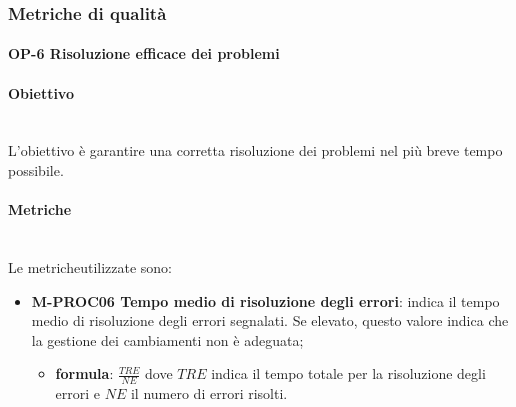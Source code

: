 \subsubsection{Metriche di qualità}
	\paragraph{OP-6 Risoluzione efficace dei problemi}
	\paragraph*{Obiettivo}\mbox{}\\ [1mm]
	L'obiettivo è garantire una corretta risoluzione dei problemi nel più breve tempo possibile.
	\paragraph*{Metriche}\mbox{}\\ [1mm]
	Le metriche\glosp utilizzate sono:
	\begin{itemize}
		\item \textbf{M-PROC06 Tempo medio di risoluzione degli errori}: indica il tempo medio di risoluzione degli errori segnalati. Se elevato, questo valore indica che la gestione dei cambiamenti non è adeguata;
		\begin{itemize}
			\item[] \textbf{formula}: $\frac{TRE}{NE}$ dove $TRE$ indica il tempo totale per la risoluzione degli errori e $NE$ il numero di errori risolti.
		\end{itemize} 
	\end{itemize}		

